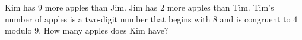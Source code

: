 Kim has $9$ more apples than Jim. Jim has $2$ more apples than Tim. Tim's number of apples is a two-digit number that begins with $8$ and is congruent to $4$ modulo $9$. How many apples does Kim have?
